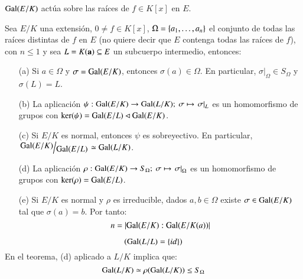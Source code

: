 \begin{obs}
    $\mathrm{Gal}(E/K)$ actúa sobre las raíces de $f \in K[x]$ en $E$.
\end{obs}

\begin{thm}\label{thm:3.11}
    Sea $E/K$ una extensión, $0 \neq f \in K[x]$, $\Omega = \left\{a_1, \ldots, a_n\right\}$ el conjunto de todas las raíces distintas de $f$ en $E$ (no quiere decir que $E$ contenga todas las raíces de $f$), con $n \leq 1$ y sea $L = K(\mathbf{a}) \subseteq E$ un subcuerpo intermedio, entonces:
    \begin{itemize}
        \item[(a)] Si $a \in \Omega$ y $\sigma = \mathrm{Gal}(E/K)$, entonces $\sigma(a) \in \Omega$. En particular, $\left.\sigma\right|_\Omega \in S_\Omega$ y $\sigma(L) = L$.
        \item[(b)] La aplicación $\psi: \mathrm{Gal}(E/K) \to \mathrm{Gal}(L/K);\ \sigma \mapsto \left.\sigma\right|_L$ es un homomorfismo de grupos con $\ker(\psi) = \mathrm{Gal}(E/L) \lhd \mathrm{Gal}(E/K)$.
        \item[(c)] Si $E/K$ es normal, entonces $\psi$ es sobreyectivo. En particular, $\quo{\gal(E/K)}{\gal(E/L)} \isom \gal(L/K)$.
        \item[(d)] La aplicación $\rho: \mathrm{Gal}(E/K) \to S_\Omega;\ \sigma \mapsto \left.\sigma\right|_\Omega$ es un homomorfismo de grupos con $\ker(\rho) = \mathrm{Gal}(E/L)$.
        \item[(e)] Si $E/K$ es normal y $\rho$ es irreducible, dados $a, b \in \Omega$ existe $\sigma \in \mathrm{Gal}(E/K)$ tal que $\sigma(a) = b$. Por tanto:
        $$
            n = \left|\mathrm{Gal}(E/K):\mathrm{Gal}(E/K(a))\right|
        $$
    \end{itemize}
\end{thm}

\begin{obs}
    $$
        \left(\mathrm{Gal}(L/L) = \left\{id\right\}\right)
    $$
    En el teorema, (d) aplicado a $L/K$ implica que:
    $$
        \mathrm{Gal}(L/K) \simeq \rho(\mathrm{Gal}(L/K)) \leq S_\Omega
    $$
\end{obs}

